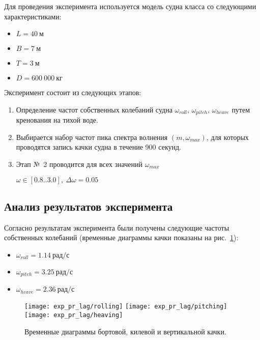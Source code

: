 Для проведения эксперимента используется модель судна класса  со следующими характеристиками:
\begin{itemize}
	\item	$L = 40\ \text{м}$
	\item	$B = 7\ \text{м}$
	\item	$T = 3\ \text{м}$
	\item	$D = 600\ 000\ \text{кг}$
\end{itemize}

Эксперимент состоит из следующих этапов:
\begin{enumerate}
	\item	Определение частот собственных колебаний судна 
			$\omega_{roll}$, $\omega_{pitch}$, $\omega_{heave}$ путем кренования на тихой воде.
	\item	Выбирается набор частот пика спектра волнения $(m, \omega_{max})$, для которых
			проводятся запись качки судна в течение 900 секунд.
	\item	Этап №~2 проводится для всех значений $\omega_{max}$
			
			$\omega \in [0.8..3.0],\ \Delta\omega=0.05$ 

\end{enumerate}

\subsection{Анализ результатов эксперимента}

Согласно результатам эксперимента были получены следующие частоты собственных колебаний (временные диаграммы качки показаны на рис.~\ref{exp_pr_rolling_lag}):
\begin{itemize}
	\item	$ \omega_{roll} = 1.14\ \text{рад/с}$
	\item	$ \omega_{pitch} = 3.25\ \text{рад/с}$
	\item	$ \omega_{heave} = 2.36\ \text{рад/с}$
\end{itemize}

\begin{figure}[ht]
	\begin{center}
	\texttt{[image: exp\_pr\_lag/rolling]}
	\texttt{[image: exp\_pr\_lag/pitching]}
	\texttt{[image: exp\_pr\_lag/heaving]}
	\end{center}
	\caption{Временные диаграммы бортовой, килевой и вертикальной качки.}
	\label{exp_pr_rolling_lag}
\end{figure}

